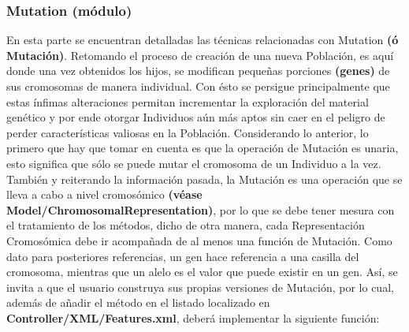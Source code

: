 \documentclass[class=report, crop=false]{standalone}
\begin{document}
\subsubsection{Mutation (módulo)}
\label{sec:a_2_4_3}
En esta parte se encuentran detalladas las técnicas 
relacionadas con Mutation \textbf{(ó Mutación)}.\medskip\break
Retomando el proceso de creación de una nueva Población, 
es aquí donde una vez obtenidos los hijos, se modifican 
pequeñas porciones \textbf{(genes)} de sus cromosomas 
de manera individual.\break
Con ésto se persigue principalmente que estas ínfimas 
alteraciones permitan incrementar la exploración del 
material genético y por ende otorgar Individuos aún más 
aptos sin caer en el peligro de perder características 
valiosas en la Población.\medskip\break
Considerando lo anterior, lo primero que hay que tomar en 
cuenta es que la operación de Mutación es unaria, esto 
significa que sólo se puede mutar el cromosoma de un 
Individuo a la vez.\break
También y reiterando la información pasada, la Mutación 
es una operación que se lleva a cabo a nivel cromosómico 
\textbf{(véase Model/ChromosomalRepresentation)}, por lo 
que se debe tener mesura con el tratamiento de los métodos, 
dicho de otra manera, cada Representación Cromosómica debe 
ir acompañada de al menos una función de Mutación.\medskip\break
Como dato para posteriores referencias, un gen hace referencia 
a una casilla del cromosoma, mientras que un alelo es el 
valor que puede existir en un gen.\break
Así, se invita a que el usuario construya sus propias 
versiones de Mutación, por lo cual, además de añadir el 
método en el listado localizado en \textbf{Controller/XML/Features.xml}, 
deberá implementar la siguiente función:
\end{document}
